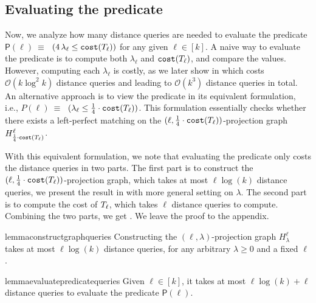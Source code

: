 \documentclass{article}
\newcommand{\bigO}{\ensuremath{\mathcal{O}}\xspace}
\begin{document}
\subsection{Evaluating the predicate} \label{sec:evaluating-the-predicate}
Now, we analyze how many distance queries are needed to evaluate the predicate $\mathsf{P}(\ell) ~\equiv~$ $( 4\,\lambda_{\ell} \leq \texttt{cost}(T_{\ell}))$ for any given $\ell \in [k]$. 
A naive way to evaluate the predicate is to compute both $\lambda_{\ell}$ and $\texttt{cost}(T_{\ell})$, and compare the values. 
However, computing each $\lambda_{\ell}$ is costly, as we later show in  which costs $\bigO(k \log^2 k)$ distance queries and leading to $\bigO(k^3)$ distance queries in total.
An alternative approach is to view the predicate in its equivalent formulation, i.e., $P(\ell) ~\equiv~$ $( \lambda_{\ell} \leq \frac{1}{4} \cdot \texttt{cost}(T_{\ell}))$.
This formulation essentially checks whether there exists a left-perfect matching on the $(\ell, \frac{1}{4} \cdot \texttt{cost}(T_{\ell}))$-projection graph $H^{\ell}_{\frac{1}{4} \cdot \texttt{cost}(T_{\ell})}$.

With this equivalent formulation, we note that evaluating the predicate only costs the distance queries in two parts. 
The first part is to construct the $(\ell, \frac{1}{4} \cdot \texttt{cost}(T_{\ell}))$-projection graph, which takes at most $\ell \log(k)$ distance queries, we present the result in  with more general setting on $\lambda$.  
The second part is to compute the cost of $T_{\ell}$, which takes $\ell$ distance queries to compute. 
Combining the two parts, we get .  
We leave the proof to the appendix.

\begin{restatable}{lemma}{constructgraphqueries}
    \label{lemma:construct-graph-queries}
    Constructing the $(\ell, \lambda)$-projection graph $H^{\ell}_{\lambda}$ takes at most $\ell \log(k)$ distance queries, for any arbitrary $\lambda \geq 0$ and a fixed $\ell$.
    
\end{restatable}


\begin{restatable}{lemma}{evaluatepredicatequeries}
    \label{lemma:evaluate-predicate-queries}
    Given $\ell \in [k]$, it takes at most $\ell \log(k) + \ell$ distance queries to evaluate the predicate $\mathsf{P}(\ell)$.
\end{restatable}
\end{document}
